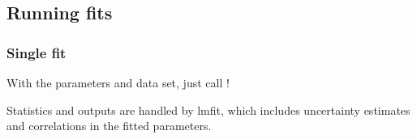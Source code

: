 \documentclass[letterpaper,table,10pt,english]{jupyterBook}
\begin{document}
\subsection{Running fits}
\label{\detokenize{part2/basic_fitting_numerics_intro_260423:running-fits}}

\subsubsection{Single fit}
\label{\detokenize{part2/basic_fitting_numerics_intro_260423:single-fit}}
\sphinxAtStartPar
With the parameters and data set, just call !

\sphinxAtStartPar
Statistics and outputs are handled by lmfit, which includes uncertainty estimates and correlations in the fitted parameters.
\end{document}
